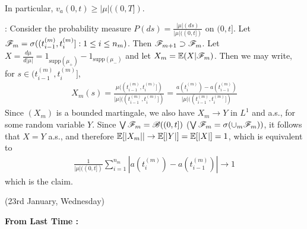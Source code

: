 \documentclass[12pt,a4paper]{article}
\newenvironment{proof}
{\begin{changemargin}{0.5cm}{0.5cm} 
	}%
	{\end{changemargin}
}
\newenvironment{subproof}
{\begin{changemargin}{0.5cm}{0.5cm} 
	}%
	{\end{changemargin}
}
\renewenvironment{i}
{\begin{itemize} 
	}%
	{\end{itemize}
}
\newenvironment{p}
{\begin{proof} 
	}%
	{\end{proof}
}
\begin{document}
\begin{p}
\begin{i}
\quad In particular, $v_a(0, t) \geq |\mu|((0,T])$.
\begin{subproof}
: Consider the probability measure $P(ds) = \frac{|\mu|(ds)}{|\mu|((0,t])}$ on $(0,t]$. Let $\mathscr{F}_m = \sigma ((t_{i-1}^{(m)}, t_i^{(m)}] : 1\leq i \leq n_m)$. Then $\mathscr{F}_{m+1} \supset \mathscr{F}_m$. Let $X= \frac{d\mu}{d|\mu|} = 1_{\text{supp}(\mu_+)} - 1_{\text{supp}(\mu_-)}$ and let $X_m = \mathbb{E}(X|\mathscr{F}_m)$. Then we may write, for $s\in (t_{i-1}^{(m)}, t_i^{(m)}]$, 
\begin{align*}
X_m(s) = \frac{\mu((t_{i-1}^{(m)}, t_i^{(m)}])}{|\mu|((t_{i-1}^{(m)}, t_i^{(m)}])}  = \frac{a(t_i^{(m)}) - a(t_{i-1}^{(m)})}{|\mu|((t_{i-1}^{(m)}, t_i^{(m)}])}
\end{align*}
Since $(X_m)$ is a bounded martingale, we also have $X_m \rightarrow Y$ in $L^1$ and a.s., for some random variable $Y$. Since $\bigvee \mathscr{F}_m = \mathscr{B}((0,t])$ ($\bigvee \mathscr{F}_m = \sigma(\cup_m \mathscr{F}_m))$, it follows that $X= Y$ a.s., and therefore $\mathbb{E}[|X_m|| \rightarrow \mathbb{E}[|Y|] = \mathbb{E}[|X|] =1$, which is equivalent to
\begin{align*}
\frac{1}{|\mu| ((0,t])} \sum_{i=1}^{n_m} |a(t_i^{(m)}) - a(t_{i-1}^{(m)})| \rightarrow 1
\end{align*}
which is the claim.
\end{subproof}
\end{i}
\end{p}
\s

\newday

(23rd January, Wednesday)
\s

\textbf{From Last Time :}
\end{document}
